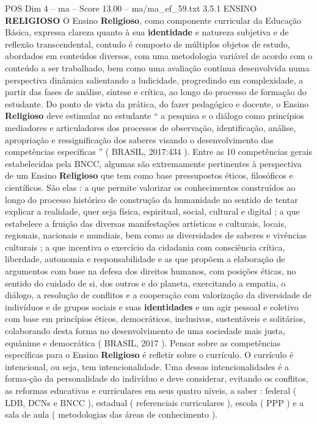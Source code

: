 \begin{textsample}{POS Dim 4 – ma – Score 13.00 – ma/ma\_ef\_59.txt}  \label{ex:f4_pos_055}
3.5.1 ENSINO \textbf{RELIGIOSO} O Ensino \textbf{Religioso}, como componente curricular da Educação Básica, expressa clareza quanto à sua \textbf{identidade} e natureza subjetiva e de reflexão transcendental, contudo é composto de múltiplos objetos de estudo, abordados em conteúdos diversos, com uma metodologia variável de acordo com o conteúdo a ser trabalhado, bem como uma avaliação contínua desenvolvida numa perspectiva dinâmica salientando a ludicidade, progredindo em complexidade, a partir das fases de análise, síntese e crítica, ao longo do processo de formação do estudante.
Do ponto de vista da prática, do fazer pedagógico e docente, o Ensino \textbf{Religioso} deve estimular no estudante “ a pesquisa e o diálogo como princípios mediadores e articuladores dos processos de observação, identificação, análise, apropriação e ressignificação dos saberes visando o desenvolvimento das competências específicas ” ( BRASIL, 2017:434 ).
Entre as 10 competências gerais estabelecidas pela BNCC, algumas são extremamente pertinentes à perspectiva de um Ensino \textbf{Religioso} que tem como base pressupostos éticos, filosóficos e científicos.
São elas : a que permite valorizar os conhecimentos construídos ao longo do processo histórico de construção da humanidade no sentido de tentar explicar a realidade, quer seja física, espiritual, social, cultural e digital ; a que estabelece a fruição das diversas manifestações artísticas e culturais, locais, regionais, nacionais e mundiais, bem como as diversidades de saberes e vivências culturais ; a que incentiva o exercício da cidadania com consciência crítica, liberdade, autonomia e responsabilidade e as que propõem a elaboração de argumentos com base na defesa dos direitos humanos, com posições éticas, no sentido do cuidado de si, dos outros e do planeta, exercitando a empatia, o diálogo, a resolução de conflitos e a cooperação com valorização da diversidade de indivíduos e de grupos sociais e suas \textbf{identidades} e um agir pessoal e coletivo com base em princípios éticos, democráticos, inclusivos, sustentáveis e solitários, colaborando desta forma no desenvolvimento de uma sociedade mais justa, equânime e democrática ( BRASIL, 2017 ).
Pensar sobre as competências específicas para o Ensino \textbf{Religioso} é refletir sobre o currículo.
O currículo é intencional, ou seja, tem intencionalidade.
Uma dessas intencionalidades é a forma-ção da personalidade do indivíduo e deve considerar, evitando os conflitos, as reformas educativas e curriculares em seus quatro níveis, a saber : federal ( LDB, DCNs e BNCC ), estadual ( referenciais curriculares ), escola ( PPP ) e a sala de aula ( metodologias das áreas de conhecimento ).

\end{textsample}
